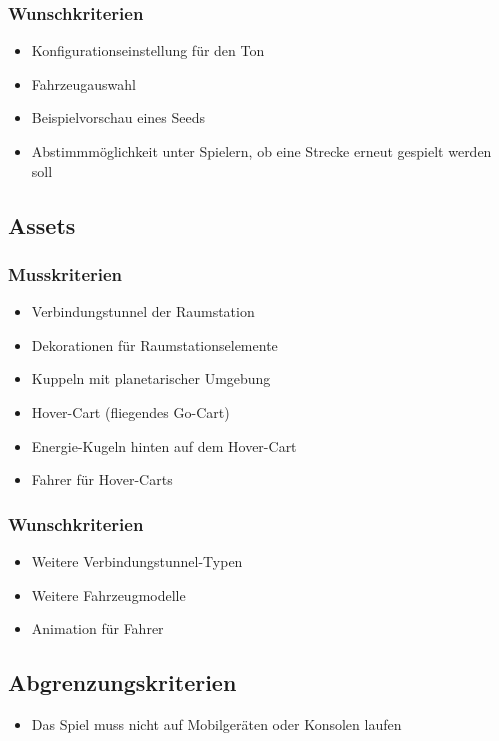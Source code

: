 \documentclass[parskip=full]{scrartcl}
\begin{document}
	\subsubsection{Wunschkriterien}
	\begin{itemize}
		\item Konfigurationseinstellung für den Ton
		\item Fahrzeugauswahl
		\item Beispielvorschau eines \glspl{Seed}
		\item Abstimmmöglichkeit unter Spielern, ob eine Strecke erneut gespielt werden soll
	\end{itemize}

	\pagebreak
	
	\subsection{Assets}
	\subsubsection{Musskriterien}
	\begin{itemize}
		\item Verbindungstunnel der Raumstation
		\item Dekorationen für Raumstationselemente
		\item Kuppeln mit planetarischer Umgebung
		\item Hover-Cart (fliegendes Go-Cart)
		\item Energie-Kugeln hinten auf dem Hover-Cart
		\item Fahrer für Hover-Carts
	\end{itemize}
	
	\subsubsection{Wunschkriterien}
	\begin{itemize}
		\item Weitere Verbindungstunnel-Typen
		\item Weitere Fahrzeugmodelle
		\item Animation für Fahrer
	\end{itemize}
	
	\subsection{Abgrenzungskriterien}
	\begin{itemize}
		\item Das Spiel muss nicht auf Mobilgeräten oder Konsolen laufen
		
	\end{itemize}
	
\end{document}
